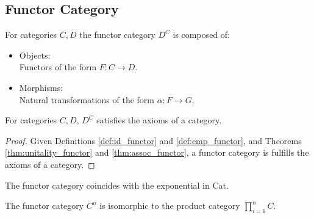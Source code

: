 \subsection{Functor Category}
\begin{definition}
  For categories $C, D$ the functor category $D^C$ is composed of:
  \parencite{leinster:basic_category_theory}
  \begin{itemize}
    \item Objects:\\
      Functors of the form $F:C\to D$.
    \item Morphisms:\\
      Natural transformations of the form $\alpha:F\to G$.
  \end{itemize}
\end{definition}

\begin{theorem}
  For categories $C, D$, $D^C$ satisfies the axioms of a category.

  \begin{proof}
    Given Definitions \ref{def:id_functor} and \ref{def:cmp_functor}, and
    Theorems \ref{thm:unitality_functor} and \ref{thm:assoc_functor}, a functor
    category is fulfills the axioms of a category.
  \end{proof}
\end{theorem}

\begin{remark}
  The functor category coincides with the exponential in Cat.
\end{remark}

\begin{remark}
  The functor category $C^{\underline{n}}$ is isomorphic to the product category
  $\prod_{i=1}^n C$.
\end{remark}